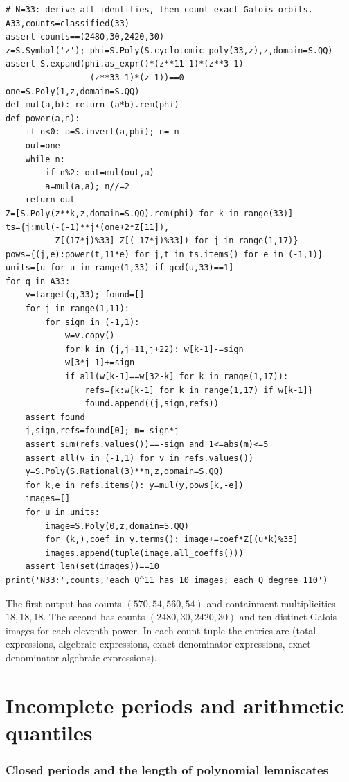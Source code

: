 \documentclass[11pt,a4paper]{article}
\theoremstyle{definition}
\theoremstyle{remark}
\numberwithin{equation}{section}
\begin{document}
{\begin{verbatim}
# N=33: derive all identities, then count exact Galois orbits.
A33,counts=classified(33)
assert counts==(2480,30,2420,30)
z=S.Symbol('z'); phi=S.Poly(S.cyclotomic_poly(33,z),z,domain=S.QQ)
assert S.expand(phi.as_expr()*(z**11-1)*(z**3-1)
                -(z**33-1)*(z-1))==0
one=S.Poly(1,z,domain=S.QQ)
def mul(a,b): return (a*b).rem(phi)
def power(a,n):
    if n<0: a=S.invert(a,phi); n=-n
    out=one
    while n:
        if n%2: out=mul(out,a)
        a=mul(a,a); n//=2
    return out
Z=[S.Poly(z**k,z,domain=S.QQ).rem(phi) for k in range(33)]
ts={j:mul(-(-1)**j*(one+2*Z[11]),
          Z[(17*j)%33]-Z[(-17*j)%33]) for j in range(1,17)}
pows={(j,e):power(t,11*e) for j,t in ts.items() for e in (-1,1)}
units=[u for u in range(1,33) if gcd(u,33)==1]
for q in A33:
    v=target(q,33); found=[]
    for j in range(1,11):
        for sign in (-1,1):
            w=v.copy()
            for k in (j,j+11,j+22): w[k-1]-=sign
            w[3*j-1]+=sign
            if all(w[k-1]==w[32-k] for k in range(1,17)):
                refs={k:w[k-1] for k in range(1,17) if w[k-1]}
                found.append((j,sign,refs))
    assert found
    j,sign,refs=found[0]; m=-sign*j
    assert sum(refs.values())==-sign and 1<=abs(m)<=5
    assert all(v in (-1,1) for v in refs.values())
    y=S.Poly(S.Rational(3)**m,z,domain=S.QQ)
    for k,e in refs.items(): y=mul(y,pows[k,-e])
    images=[]
    for u in units:
        image=S.Poly(0,z,domain=S.QQ)
        for (k,),coef in y.terms(): image+=coef*Z[(u*k)%33]
        images.append(tuple(image.all_coeffs()))
    assert len(set(images))==10
print('N33:',counts,'each Q^11 has 10 images; each Q degree 110')
\end{verbatim}
}
The first output has counts $(570,54,560,54)$ and containment multiplicities
$18,18,18$. The second has counts $(2480,30,2420,30)$ and ten distinct
Galois images for each eleventh power. In each count tuple the entries are
(total expressions, algebraic expressions, exact-denominator expressions,
exact-denominator algebraic expressions).

\clearpage

\part{Incomplete periods and arithmetic quantiles}
\section{Closed periods and the length of polynomial lemniscates}
\label{beta-sec-length}
\end{document}

